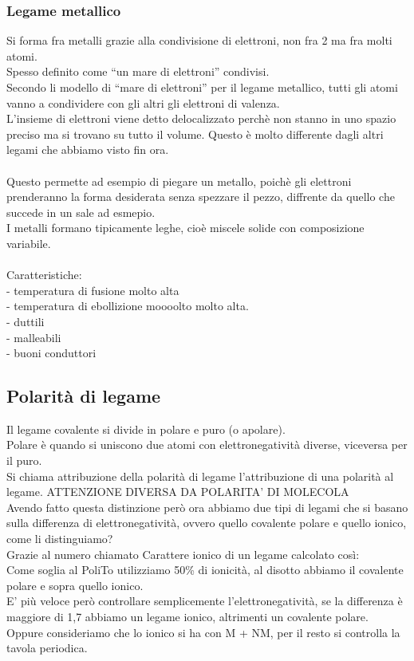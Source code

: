 \subsubsection{Legame metallico}
Si forma fra metalli grazie alla condivisione di elettroni, non fra 2 ma fra molti atomi. \\
Spesso definito come “un mare di elettroni” condivisi. \\
Secondo li modello di “mare di elettroni” per il legame metallico, tutti gli atomi vanno a condividere con gli altri gli elettroni di valenza. \\
L’insieme di elettroni viene detto delocalizzato perchè non stanno in uno spazio preciso ma si trovano su tutto il volume. Questo è molto differente dagli altri legami che abbiamo visto fin ora.\\\\
Questo permette ad esempio di piegare un metallo, poichè gli elettroni prenderanno la forma desiderata senza spezzare il pezzo, diffrente da quello che succede in un sale ad esmepio.\\
I metalli formano tipicamente leghe, cioè miscele solide con composizione variabile. \\\\
Caratteristiche:\\
\tab- temperatura di fusione molto alta\\
\tab- temperatura di ebollizione moooolto molto alta.\\ 
\tab- duttili\\
\tab- malleabili\\
\tab- buoni conduttori
\subsection{Polarità di legame}
Il legame covalente si divide in polare e puro (o apolare).\\
Polare è quando si uniscono due atomi con elettronegatività diverse, viceversa per il puro. \\
Si chiama attribuzione della polarità di legame l’attribuzione di una polarità al legame. ATTENZIONE DIVERSA DA POLARITA’ DI MOLECOLA\\
Avendo fatto questa distinzione però ora abbiamo due tipi di legami che si basano sulla differenza di elettronegatività, ovvero quello covalente polare e quello ionico, come li distinguiamo?\\
Grazie al numero chiamato Carattere ionico di un legame calcolato così:\\
Come soglia al PoliTo utilizziamo 50\% di ionicità, al disotto abbiamo il covalente polare e sopra quello ionico. \\
E’ più veloce però controllare semplicemente l’elettronegatività, se la differenza è maggiore di 1,7 abbiamo un legame ionico, altrimenti un covalente polare. \\
Oppure consideriamo che lo ionico si ha con M + NM, per il resto si controlla la tavola periodica. 
